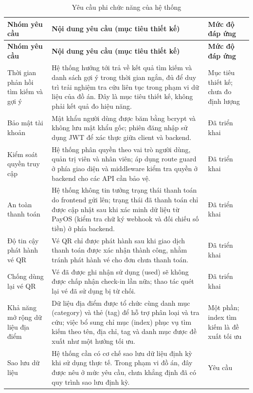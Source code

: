 ﻿\documentclass[../DoAn.tex]{subfiles}
\begin{document}
\begingroup
\small
\renewcommand{\arraystretch}{1.2}
\setlength{\tabcolsep}{4pt}
\begin{longtable}{|L{3.0cm}|L{8.4cm}|L{2.8cm}|}
\caption{Yêu cầu phi chức năng của hệ thống}\label{tab:nonfunctional}\\
\hline
\textbf{Nhóm yêu cầu} & \textbf{Nội dung yêu cầu (mục tiêu thiết kế)} & \textbf{Mức độ đáp ứng} \\
\hline
\endfirsthead
\hline
\textbf{Nhóm yêu cầu} & \textbf{Nội dung yêu cầu (mục tiêu thiết kế)} & \textbf{Mức độ đáp ứng} \\
\hline
\endhead
Thời gian phản hồi tìm kiếm và gợi ý & Hệ thống hướng tới trả về kết quả tìm kiếm và danh sách gợi ý trong thời gian ngắn, đủ để duy trì trải nghiệm tra cứu liên tục trong phạm vi dữ liệu của đồ án. Đây là mục tiêu thiết kế, không phải kết quả đo hiệu năng. & Mục tiêu thiết kế; chưa đo định lượng \\
\hline
Bảo mật tài khoản & Mật khẩu người dùng được băm bằng bcrypt và không lưu mật khẩu gốc; phiên đăng nhập sử dụng JWT để xác thực giữa client và backend. & Đã triển khai \\
\hline
Kiểm soát quyền truy cập & Hệ thống phân quyền theo vai trò người dùng, quản trị viên và nhân viên; áp dụng route guard ở phía giao diện và middleware kiểm tra quyền ở backend cho các API cần bảo vệ. & Đã triển khai \\
\hline
An toàn thanh toán & Hệ thống không tin tưởng trạng thái thanh toán do frontend gửi lên; trạng thái đã thanh toán chỉ được cập nhật sau khi xác minh dữ liệu từ PayOS (kiểm tra chữ ký webhook và đối chiếu số tiền) ở phía backend. & Đã triển khai \\
\hline
Độ tin cậy phát hành vé QR & Vé QR chỉ được phát hành sau khi giao dịch thanh toán được xác nhận thành công, nhằm tránh phát hành vé cho đơn chưa thanh toán. & Đã triển khai \\
\hline
Chống dùng lại vé QR & Vé đã được ghi nhận sử dụng (used) sẽ không được chấp nhận check-in lần nữa; thao tác quét lại vé đã sử dụng bị từ chối. & Đã triển khai \\
\hline
Khả năng mở rộng dữ liệu địa điểm & Dữ liệu địa điểm được tổ chức cùng danh mục (category) và thẻ (tag) để hỗ trợ phân loại và tra cứu; việc bổ sung chỉ mục (index) phục vụ tìm kiếm theo tên, địa chỉ, tag và danh mục được đề xuất như một hướng tối ưu. & Một phần; index tìm kiếm là đề xuất tối ưu \\
\hline
Sao lưu dữ liệu & Hệ thống cần có cơ chế sao lưu dữ liệu định kỳ khi sử dụng thực tế. Trong phạm vi đồ án, đây được nêu ở mức yêu cầu, chưa khẳng định đã có quy trình sao lưu định kỳ. & Yêu cầu \\

\end{longtable}
\end{document}
